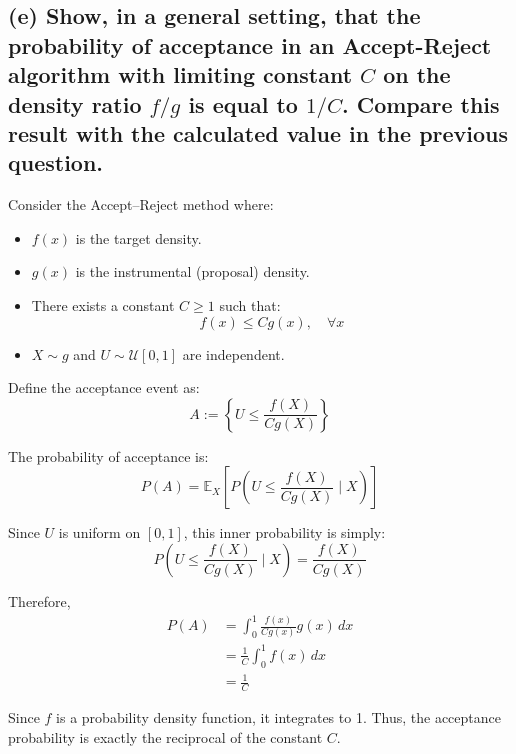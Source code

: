 \newpage
\subsection*{(e) Show, in a general setting, that the probability of acceptance in an Accept-Reject algorithm with limiting constant $C$ on the density ratio $f/g$ is equal to $1/C$. Compare this result with the calculated value in the previous question.}

Consider the Accept–Reject method where:

\begin{itemize}
    \item \(f(x)\) is the target density.
    \item \(g(x)\) is the instrumental (proposal) density.
    \item There exists a constant \(C \geq 1\) such that:
    \begin{equation}
    f(x) \leq C g(x), \quad \forall x
    \end{equation}
    \item \(X \sim g\) and \(U \sim \mathcal{U}[0,1]\) are independent.
\end{itemize}

Define the acceptance event as:
\begin{equation}
A := \left\{ U \leq \frac{f(X)}{C g(X)} \right\}
\end{equation}

The probability of acceptance is:
\begin{equation}
P(A) = \mathbb{E}_X \left[ P\left(U \leq \frac{f(X)}{C g(X)} \mid X \right) \right]
\end{equation}

Since \(U\) is uniform on \([0,1]\), this inner probability is simply:
\begin{equation}
P\left(U \leq \frac{f(X)}{C g(X)} \mid X \right) = \frac{f(X)}{C g(X)}
\end{equation}

Therefore,
\begin{align}
P(A) &= \int_0^1 \frac{f(x)}{C g(x)} g(x) \, dx \\
&= \frac{1}{C} \int_0^1 f(x) \, dx \\
&= \frac{1}{C}
\end{align}

Since \(f\) is a probability density function, it integrates to 1. Thus, the acceptance probability is exactly the reciprocal of the constant \(C\).

